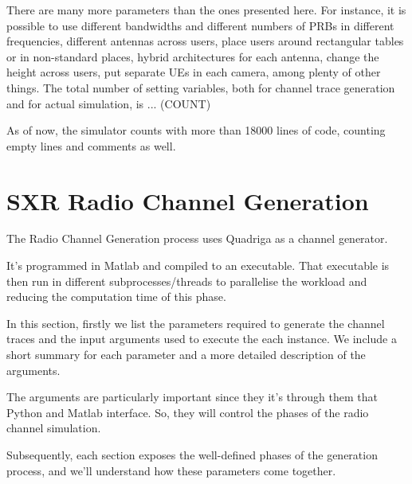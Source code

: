 \label{ap:implementation}






There are many more parameters than the ones presented here. For instance, it is possible to use different bandwidths and different numbers of PRBs in different frequencies, different antennas across users, place users around rectangular tables or in non-standard places, hybrid architectures for each antenna, change the height across users, put separate UEs in each camera, among plenty of other things. The total number of setting variables, both for channel trace generation and for actual simulation, is ... (COUNT)

As of now, the simulator counts with more than 18000 lines of code, counting empty lines and comments as well.






\section{SXR Radio Channel Generation}
\label{sec:implementation}




The Radio Channel Generation process uses Quadriga as a channel generator. 

It's programmed in Matlab and compiled to an executable. That executable is then run in different subprocesses/threads to parallelise the workload and reducing the computation time of this phase.


In this section, firstly we list the parameters required to generate the channel traces and the input arguments used to execute the each instance. We include a short summary for each parameter and a more detailed description of the arguments.

The arguments are particularly important since they it's through them that Python and Matlab interface. So, they will control the phases of the radio channel simulation.

Subsequently, each section exposes the well-defined phases of the generation process, and we'll understand how these parameters come together.

